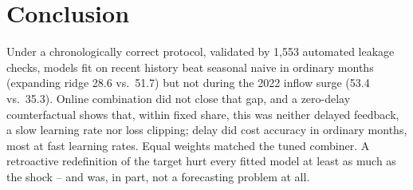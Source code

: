 \documentclass[runningheads]{llncs}
\begin{document}
\section{Conclusion}

Under a chronologically correct protocol, validated by 1{,}553 automated leakage checks, models fit
on recent history beat seasonal naive in ordinary months (expanding ridge 28.6 vs.\ 51.7) but not
during the 2022 inflow surge (53.4 vs.\ 35.3). Online combination did not close that gap, and a
zero-delay counterfactual shows that, within fixed share, this was neither delayed feedback, a slow
learning rate nor loss clipping; delay did cost accuracy in ordinary months, most at fast learning rates. Equal weights matched the tuned
combiner. A retroactive redefinition of the target hurt every fitted model at least as much as the
shock -- and was, in part, not a forecasting problem at all.



\end{document}
